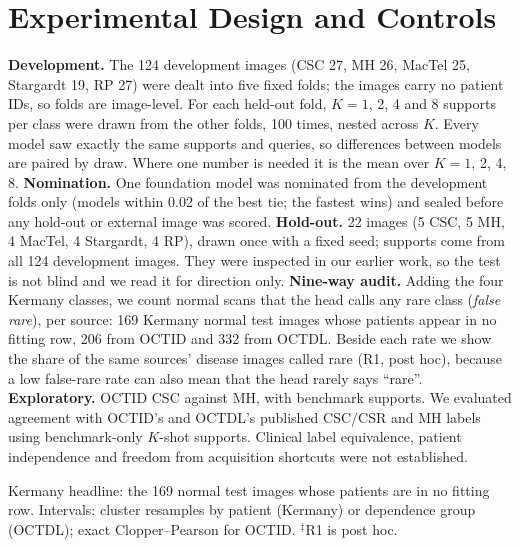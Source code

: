 \documentclass[conference]{IEEEtran}
\begin{document}
\section{Experimental Design and Controls}
\textbf{Development.} The 124 development images (CSC 27, MH 26, MacTel 25, Stargardt 19, RP 27) were dealt into five fixed folds; the images carry no patient IDs, so folds are image-level. For each held-out fold, $K=1$, 2, 4 and 8 supports per class were drawn from the other folds, 100 times, nested across $K$. Every model saw exactly the same supports and queries, so differences between models are paired by draw. Where one number is needed it is the mean over $K=1$, 2, 4, 8.
\textbf{Nomination.} One foundation model was nominated from the development folds only (models within 0.02 of the best tie; the fastest wins) and sealed before any hold-out or external image was scored.
\textbf{Hold-out.} 22 images (5 CSC, 5 MH, 4 MacTel, 4 Stargardt, 4 RP), drawn once with a fixed seed; supports come from all 124 development images. They were inspected in our earlier work, so the test is not blind and we read it for direction only.
\textbf{Nine-way audit.} Adding the four Kermany classes, we count normal scans that the head calls any rare class (\emph{false rare}), per source: 169 Kermany normal test images whose patients appear in no fitting row, 206 from OCTID and 332 from OCTDL. Beside each rate we show the share of the same sources' disease images called rare (R1, post hoc), because a low false-rare rate can also mean that the head rarely says ``rare''.
\textbf{Exploratory.} OCTID CSC against MH, with benchmark supports. We evaluated agreement with OCTID's and OCTDL's published CSC/CSR and MH labels using benchmark-only $K$-shot supports. Clinical label equivalence, patient independence and freedom from acquisition shortcuts were not established.

\begin{table}[t]
\caption{Nine-way audit (locked; R1 post hoc): truly normal scans that the head calls any of the five rare classes, with called-NORMAL counts and, beside them, disease images of the same sources called rare.}
\label{tab:frr}
\centering\footnotesize
\resizebox{\textwidth}{!}{}
\par\smallskip
\parbox{\textwidth}{\footnotesize Kermany headline: the 169 normal test images whose patients are in no fitting row. Intervals: cluster resamples by patient (Kermany) or dependence group (OCTDL); exact Clopper--Pearson for OCTID. $^\ddagger$R1 is post hoc.}
\end{table}
\end{document}
